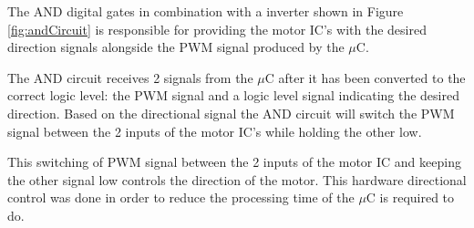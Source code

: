 The AND digital gates in combination with a inverter shown in Figure \ref{fig:andCircuit} is responsible for providing the motor IC's with the desired direction signals alongside the PWM signal produced by the $\mu$C.

The AND circuit receives 2 signals from the $\mu$C after it has been converted to the correct logic level: the PWM signal and a logic level signal indicating the desired direction. Based on the directional signal the AND circuit will switch the PWM signal between the 2 inputs of the motor IC's while holding the other low. %

This switching of PWM signal between the 2 inputs of the motor IC and keeping the other signal low controls the direction of the motor. This hardware directional control was done in order to reduce the processing time of the $\mu$C is required to do.